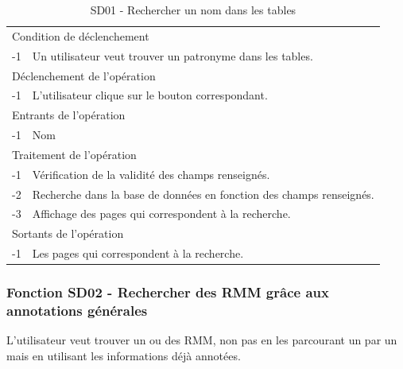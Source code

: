 \documentclass[a4paper]{article}
\begin{document}
\begin{table}[H]
  \centering
   \small
	\begin{tabular}{|c|p{12cm}|}
   		\hline
   			\rowcolor{lightgray}\multicolumn{2}{|c|}{\textbf{SD01 - Rechercher un nom dans les tables}} \\
   		\hline
   			\multicolumn{2}{|l|}{Condition de d\'eclenchement} \\
   		\hline
   			-1 & Un utilisateur veut trouver un patronyme dans les tables. \\
   		\hline
   			\multicolumn{2}{|l|}{D\'eclenchement de l'op\'eration} \\
   		\hline
   			-1 & L'utilisateur clique sur le bouton correspondant. \\
   		\hline
   			\multicolumn{2}{|l|}{Entrants de l'op\'eration} \\
   		\hline
   			-1 & Nom \\
   		\hline
   			\multicolumn{2}{|l|}{Traitement de l'op\'eration} \\
  		\hline
  			-1 & Vérification de la validité des champs renseignés. \\
   			-2 & Recherche dans la base de données en fonction des champs renseignés. \\
        	-3 & Affichage des pages qui correspondent à la recherche. \\
   		\hline
   			\multicolumn{2}{|l|}{Sortants de l'op\'eration} \\
   		\hline
   			-1 & Les pages qui correspondent à la recherche. \\
   		\hline
	\end{tabular}
  \caption{SD01 - Rechercher un nom dans les tables}
  \normalsize
  \label{tab:SD01}
\end{table}

\subsubsection{Fonction SD02 - Rechercher des RMM grâce aux annotations générales}

L'utilisateur veut trouver un ou des RMM, non pas en les parcourant un par un mais en utilisant les informations déjà annotées.
\\
\end{document}

